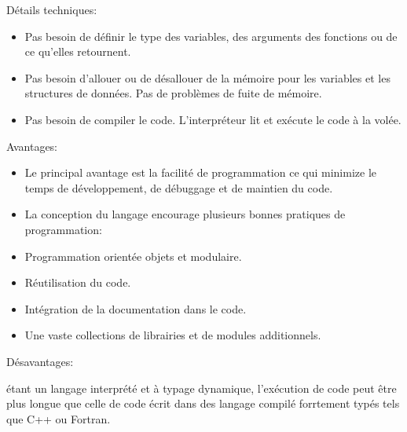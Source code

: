 \documentclass[letterpaper,10pt,english]{sphinxmanual}
\begin{document}
Détails techniques:
\begin{itemize}
\item {} 
 Pas besoin de définir le type des variables, des arguments des fonctions ou de ce qu’elles retournent.

\item {} 
 Pas besoin d’allouer ou de désallouer de la mémoire pour les variables et les structures de données. Pas de problèmes de fuite de mémoire.

\item {} 
 Pas besoin de compiler le code. L’interpréteur  lit et exécute le code à la volée.

\end{itemize}

Avantages:
\begin{itemize}
\item {} 
Le principal avantage est la facilité de programmation ce qui minimize le temps de développement, de débuggage et de maintien du code.

\item {} 
La conception du langage encourage plusieurs bonnes pratiques de programmation:

\item {} 
Programmation orientée objets et modulaire.

\item {} 
Réutilisation du code.

\item {} 
Intégration de la documentation dans le code.

\item {} 
Une vaste collections de librairies et de modules additionnels.

\end{itemize}

Désavantages:

 étant un langage interprété et à typage dynamique, l’exécution de code  peut être plus longue que celle de code écrit dans des langage compilé forrtement typés tels que C++ ou Fortran.

\begin{sphinxVerbatim}[commandchars=\\\{\}]
\end{sphinxVerbatim}
\end{document}

